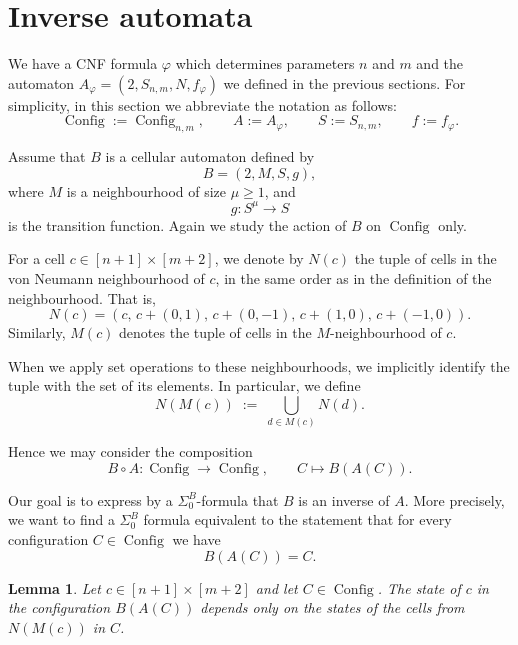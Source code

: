 \documentclass{article}
\theoremstyle{plain}
\newtheorem{lemma}[theorem]{Lemma}
\theoremstyle{definition}
\DeclareMathOperator{\Config}{Config}
\begin{document}
\section{Inverse automata}\label{sec:inverse_automata}

We have a CNF formula $\varphi$ which determines parameters $n$ and $m$ and the automaton $A_\varphi =(2, S_{n,m}, N, f_\varphi)$ we defined in the previous sections.  
For simplicity, in this section we abbreviate the notation as follows:
\[
\Config := \Config_{n,m}, 
\qquad 
A := A_\varphi,
\qquad
S := S_{n,m}, 
\qquad 
f := f_\varphi.
\]

Assume that $B$ is a cellular automaton defined by
\[
B = (2, M, S, g),
\]
where $M$ is a neighbourhood of size $\mu \ge 1$, and 
\[
g : S^\mu \to S
\]
is the transition function. Again we study the action of $B$ on $\Config$ only.

For a cell $c \in [n+1] \times [m+2]$, we denote by $N(c)$ the tuple of
cells in the von Neumann neighbourhood of $c$, in the same order as in
the definition of the neighbourhood. That is,
\[
N(c) = (c,\, c+(0,1),\, c+(0,-1),\, c+(1,0),\, c+(-1,0)).
\]
Similarly, $M(c)$ denotes the tuple of cells in the $M$-neighbourhood of $c$. 

When we apply set operations to these neighbourhoods, we implicitly
identify the tuple with the set of its elements. In particular, we define
\[
N(M(c)) \; := \; \bigcup_{d \in M(c)} N(d).
\]

Hence we may consider the composition
\[
B \circ A : \Config \to \Config , \qquad C \mapsto B(A(C)).
\]

Our goal is to express by a $\Sigma^B_0$-formula that $B$ is an inverse of $A$.
More precisely, we want to find a $\Sigma^B_0$ formula equivalent to the statement that for every configuration
$C \in \Config$ we have
\[
B(A(C)) = C .
\]

\begin{lemma}
Let $c \in [n+1] \times [m+2]$ and let $C \in \Config$. The state of $c$ in the
configuration $B(A(C))$ depends only on the states of the cells from
$N(M(c))$ in $C$.
\end{lemma}
\end{document}
